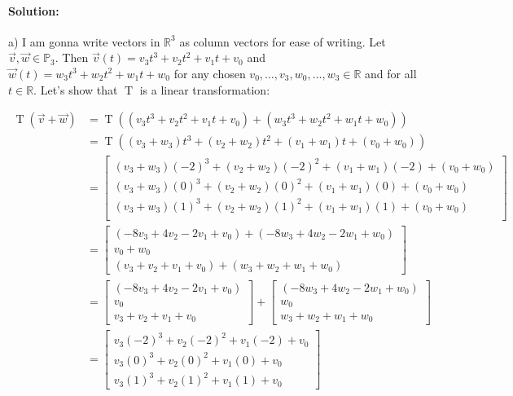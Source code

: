 \documentclass[12pt, letterpaper]{article}
\newcommand{\R}{\mathbb{R}}
\theoremstyle{statement}
\theoremstyle{statement}
\newenvironment{Solution}{\noindent\ignorespaces\paragraph{Solution:}}{\hfill \ding{122}\par\noindent}
\newcommand{\func}[2]{\operatorname{#1}(#2)}
\begin{document}
    \begin{Solution}
    a) I am gonna write vectors in $\R^3$ as column vectors for ease of writing. Let $\Vec{v}, \Vec{w} \in \mathbb{P}_3$. Then $\Vec{v}(t) = v_3t^3+v_2t^2+v_1t+v_0$ and $\Vec{w}(t)= w_3t^3+w_2t^2+w_1t+w_0$ for any chosen $v_0,\dots,v_3,w_0,\dots,w_3 \in \R$ and for all $t \in \R$. Let's show that $\operatorname{T}$ is a linear transformation:
    
    \begin{align*}
        \func{T}{\Vec{v}+\Vec{w}} &= \operatorname{T}((v_3t^3+v_2t^2+v_1t+v_0) + (w_3t^3+w_2t^2+w_1t+w_0)) \\
        &= \operatorname{T}((v_3+w_3)t^3 + (v_2+w_2)t^2 + (v_1+w_1)t + (v_0+w_0)) \\
        &= \begin{bmatrix}
        (v_3+w_3)(-2)^3 + (v_2+w_2)(-2)^2 + (v_1+w_1)(-2) + (v_0+w_0) \\ 
        (v_3+w_3)(0)^3 + (v_2+w_2)(0)^2 + (v_1+w_1)(0) + (v_0+w_0) \\
        (v_3+w_3)(1)^3 + (v_2+w_2)(1)^2 + (v_1+w_1)(1) + (v_0+w_0) \\ 
        \end{bmatrix} \\
        &= \begin{bmatrix}
        (-8v_3 + 4v_2 - 2v_1 + v_0) +
        (-8w_3 + 4w_2 - 2w_1 + w_0) \\
        v_0 + w_0 \\
        (v_3 + v_2 + v_1 + v_0) 
        + (w_3 + w_2 + w_1 + w_0)
        \end{bmatrix} \\
        &= \begin{bmatrix}
        (-8v_3 + 4v_2 - 2v_1 + v_0) \\
        v_0 \\
        v_3 + v_2 + v_1 + v_0
        \end{bmatrix}
        + 
        \begin{bmatrix}
        (-8w_3 + 4w_2 - 2w_1 + w_0) \\
        w_0 \\
        w_3 + w_2 + w_1 + w_0
        \end{bmatrix} \\
        &= 
        \begin{bmatrix}
        v_3(-2)^3 + v_2(-2)^2 + v_1(-2) + v_0 \\
        v_3(0)^3 + v_2(0)^2 + v_1(0) + v_0 \\
        v_3(1)^3 + v_2(1)^2 + v_1(1) + v_0

\end{bmatrix}
\end{align*}
\end{Solution}
\end{document}
